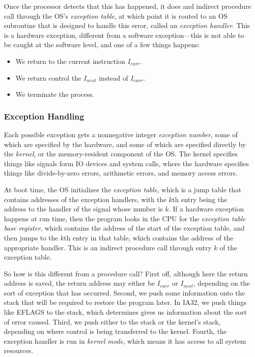 \documentclass[fleqn]{article}
\begin{document}
Once the processor detects that this has happened, it does and indirect procedure call through the OS's \textit{exception table}, at which point it is routed to an OS subroutine that is designed to handle this error, called an \textit{exception handler}. This is a hardware exception, different from a software exception---this is not able to be caught at the software level, and one of a few things happens:

\begin{itemize}
\item We return to the current instruction $I_{curr}$.
\item We return control the $I_{next}$ instead of $I_{curr}$.
\item We terminate the process.
\end{itemize}

\subsubsection{Exception Handling}

Each possible exception gets a nonnegative integer \textit{exception number}, some of which are specified by the hardware, and some of which are specified directly by the \textit{kernel}, or the memory-resident component of the OS. The kernel specifies things like signals form IO devices and system calls, where the hardware specifies things like divide-by-zero errors, arithmetic errors, and memory access errors.

At boot time, the OS initializes the \textit{exception table}, which is a jump table that contains addresses of the exception handlers, with the $k$th entry being the address to the handler of the signal whose number is $k$. If a hardware exception happens at run time, then the program looks in the CPU for the \textit{exception table base register}, which contains the address of the start of the exception table, and then jumps to the $k$th entry in that table, which contains the address of the appropriate handler. This is an indirect procedure call through entry $k$ of the exception table.

So how is this different from a procedure call? First off, although here the return address is saved, the return address may either be $I_{curr}$ or $I_{next}$, depending on the sort of exception that has occurred. Second, we push some information onto the stack that will be required to restore the program later. In IA32, we push things like EFLAGS to the stack, which determines gives us information about the sort of error caused. Third, we push either to the stack or the kernel's stack, depending on where control is being transferred to the kernel. Fourth, the exception handler is run in \textit{kernel mode}, which means it has access to all system resources.
\end{document}
